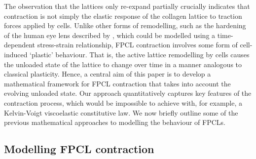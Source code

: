 The observation that the lattices only re-expand partially crucially indicates that contraction is not simply the elastic response of the collagen lattice to traction forces applied by cells. Unlike other forms of remodelling, such as the hardening of the human eye lens described by \citet{Augusteyn2010}, which could be modelled using a time-dependent stress-strain relationship,  FPCL contraction involves some form of cell-induced `plastic' behaviour. That is, the active lattice remodelling by cells causes the unloaded state of the lattice to change over time in a manner analogous to classical plasticity. Hence, a central aim of this paper is to develop a mathematical framework for FPCL contraction that takes into account the evolving unloaded state. Our approach quantitatively captures key features of the contraction process, which would be impossible to achieve with, for example, a Kelvin-Voigt viscoelastic constitutive law. We now briefly outline some of the previous mathematical approaches to modelling the behaviour of FPCLs.

\subsection{Modelling FPCL contraction}
\label{S:PrevModels}

